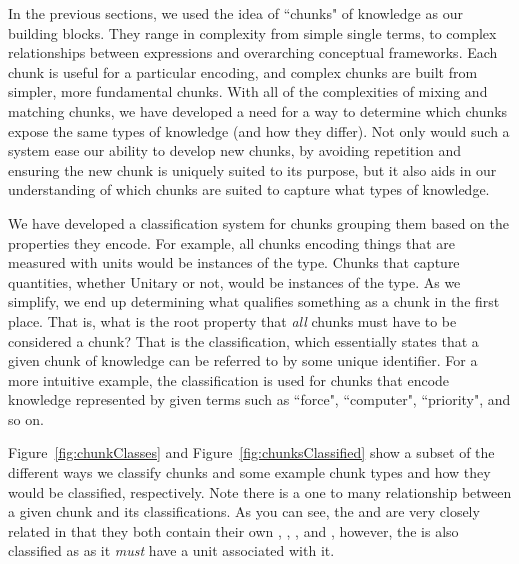 
In the previous sections, we used the idea of ``chunks" of knowledge as our 
building blocks. They range in complexity from simple single terms, to complex 
relationships between expressions and overarching conceptual frameworks. Each 
chunk is useful for a particular encoding, and complex chunks are built from 
simpler, more fundamental chunks. With all of the complexities of mixing and 
matching chunks, we have developed a need for a way to determine which chunks 
expose the same types of knowledge (and how they differ). Not only would such a 
system ease our ability to develop new chunks, by avoiding repetition and 
ensuring the new chunk is uniquely suited to its purpose, but it 
also aids in our understanding of which chunks are suited to capture what types 
of knowledge.

We have developed a classification system for chunks grouping them based on 
the properties they encode. For example, all chunks encoding things that are 
measured with units would be instances of the  type. Chunks that 
capture quantities, whether Unitary or not, 
would be instances of the  type. As we simplify, we end up 
determining what qualifies something as a chunk in the first place. That is, 
what is the root property that \emph{all} chunks must have to be considered a 
chunk? That is the  classification, which essentially states that 
a given chunk of knowledge can be referred to by some unique identifier. For a 
more intuitive example, the  classification is used 
for chunks that encode knowledge represented by given terms such as ``force", 
``computer", ``priority", and so on.

Figure~\ref{fig:chunkClasses} and Figure~\ref{fig:chunksClassified} show a 
subset of the different ways we classify chunks and some example chunk types 
and how they would be classified, respectively. Note there is a one to many 
relationship between a given chunk and its classifications. As you can see, the 
 and  are very closely related in 
that they both contain their own , , 
, and , however, the  is also 
classified as  as it \emph{must} have a unit associated with it.

